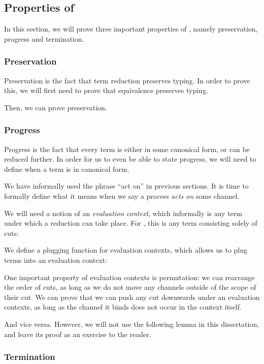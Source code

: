 

\subsection{Properties of \rcp}\label{sec:cp-properties}
In this section, we will prove three important properties of \rcp, namely
preservation, progress and termination.

\subsubsection{Preservation}
Preservation is the fact that term reduction preserves typing. In order to prove
this, we will first need to prove that equivalence preserves typing.


Then, we can prove preservation.




\subsubsection{Progress}
Progress is the fact that every term is either in some canonical form, or can be
reduced further. In order for us to even be able to state progress, we will need
to define when a term is in canonical form.

We have informally used the phrase ``act on'' in previous sections. It is time
to formally define what it means when we say a process \emph{acts on} some
channel.


We will need a notion of an \emph{evaluation context}, which
informally is any term under which a reduction can take place. For \rcp, this is
any term consisting solely of cuts:

We define a plugging function for evaluation contexts, which allows us to plug
terms into an evaluation context:

One important property of evaluation contexts is permutation: we can rearrange
the order of cuts, as long as we do not move any channels outside of the scope
of their cut.
We can prove that we can push any cut downwards under an evaluation contexts, as
long as the channel it binds does not occur in the context itself.

And vice versa. However, we will not use the following lemma in this
dissertation, and leave its proof as an exercise to the reader.





\subsubsection{Termination}





